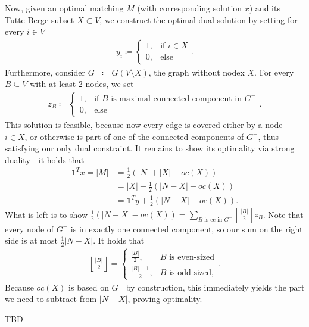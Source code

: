 \begin{aufgabe}
    Now, given an optimal matching $M$ (with corresponding solution $x$) and its Tutte-Berge subset $X \subset V$,
    we construct the optimal dual solution by setting for every $i \in V$
    \begin{align*}
        y_i \coloneqq \begin{cases}
                          1, & \text{if } i \in X \\
                          0, & \text{else}
                      \end{cases}.
    \end{align*}
    Furthermore, consider $G^- \coloneqq G(V \setminus X)$, the graph without nodex $X$.
    For every $B \subseteq V$ with at least 2 nodes, we set
    \begin{align*}
        z_B \coloneqq \begin{cases}
                          1, & \text{if $B$ is maximal connected component in $G^-$} \\
                          0, & \text{else}
                      \end{cases}.
    \end{align*}
    This solution is feasible, because now every edge is covered either by a node $i \in X$, or
    otherwise is part of one of the connected components of $G^-$, thus satisfying our only dual constraint.
    It remains to show its optimality via strong duality - it holds that
    \begin{align*}
        \mathbf{1}^Tx = |M| & =\frac{1}{2}(|N|+|X|-oc(X))                   \\
                            & = |X| + \frac{1}{2}(|N-X| - oc(X))            \\
                            & = \mathbf{1}^Ty + \frac{1}{2}(|N-X| - oc(X)).
    \end{align*}
    What is left is to show $\frac{1}{2}(|N-X| - oc(X)) = \sum_{\text{$B$ is cc in $G^-$}}\left\lfloor \frac{|B|}{2} \right\rfloor z_B$.
    Note that every node of $G^-$ is in exactly one connected component, so our sum on the right side is at most $\frac{1}{2}|N-X|$.
    It holds that
    \begin{align*}
        \left\lfloor \frac{|B|}{2} \right\rfloor = \begin{cases}
                                                       \frac{|B|}{2},   & \text{$B$ is even-sized} \\
                                                       \frac{|B|-1}{2}, & \text{$B$ is odd-sized},
                                                   \end{cases}.
    \end{align*}
    Because $oc(X)$ is based on $G^-$ by construction, this immediately yields the part we need to subtract from $|N-X|$, proving optimality.

\end{aufgabe}
\begin{aufgabe}
    TBD
\end{aufgabe}